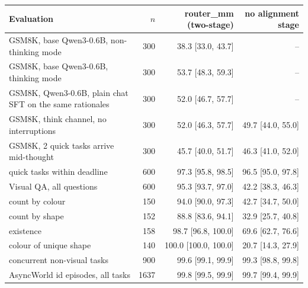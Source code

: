 \begin{tabular}{lrrr}
\toprule
Evaluation & $n$ & router\_mm (two-stage) & no alignment stage \\
\midrule
GSM8K, base Qwen3-0.6B, non-thinking mode & 300 & 38.3 {\scriptsize[33.0, 43.7]} & -- \\
GSM8K, base Qwen3-0.6B, thinking mode & 300 & 53.7 {\scriptsize[48.3, 59.3]} & -- \\
GSM8K, Qwen3-0.6B, plain chat SFT on the same rationales & 300 & 52.0 {\scriptsize[46.7, 57.7]} & -- \\
GSM8K, think channel, no interruptions & 300 & 52.0 {\scriptsize[46.3, 57.7]} & 49.7 {\scriptsize[44.0, 55.0]} \\
GSM8K, 2 quick tasks arrive mid-thought & 300 & 45.7 {\scriptsize[40.0, 51.7]} & 46.3 {\scriptsize[41.0, 52.0]} \\
\quad quick tasks within deadline & 600 & 97.3 {\scriptsize[95.8, 98.5]} & 96.5 {\scriptsize[95.0, 97.8]} \\
Visual QA, all questions & 600 & 95.3 {\scriptsize[93.7, 97.0]} & 42.2 {\scriptsize[38.3, 46.3]} \\
\quad count by colour & 150 & 94.0 {\scriptsize[90.0, 97.3]} & 42.7 {\scriptsize[34.7, 50.0]} \\
\quad count by shape & 152 & 88.8 {\scriptsize[83.6, 94.1]} & 32.9 {\scriptsize[25.7, 40.8]} \\
\quad existence & 158 & 98.7 {\scriptsize[96.8, 100.0]} & 69.6 {\scriptsize[62.7, 76.6]} \\
\quad colour of unique shape & 140 & 100.0 {\scriptsize[100.0, 100.0]} & 20.7 {\scriptsize[14.3, 27.9]} \\
\quad concurrent non-visual tasks & 900 & 99.6 {\scriptsize[99.1, 99.9]} & 99.3 {\scriptsize[98.8, 99.8]} \\
AsyncWorld id episodes, all tasks & 1637 & 99.8 {\scriptsize[99.5, 99.9]} & 99.7 {\scriptsize[99.4, 99.9]} \\
\bottomrule
\end{tabular}

